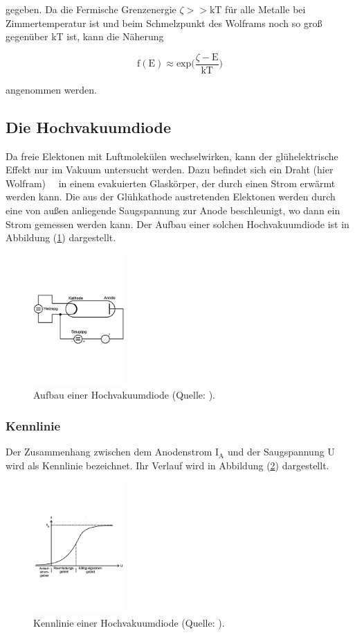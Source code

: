 \noindent
gegeben.
Da die Fermische Grenzenergie $\zeta >> \text{kT}$ für alle Metalle bei Zimmertemperatur ist 
und beim Schmelzpunkt des Wolframs noch so groß gegenüber kT ist, 
kann die Näherung

\begin{equation}
\text{f}(\text{E}) \approx \text{exp} \biggl( \frac{\zeta-\text{E}}{\text{kT}} \biggr)
\label{eqn:fermi2}
\end{equation}

\noindent
angenommen werden.
%
\subsection{Die Hochvakuumdiode}

\noindent
Da freie Elektonen mit Luftmolekülen wechselwirken, kann der glühelektrische Effekt nur im Vakuum untersucht werden.
Dazu befindet sich ein Draht (hier Wolfram)    in einem evakuierten Glaskörper, der durch einen Strom erwärmt werden kann.
Die aus der Glühkathode austretenden Elektonen werden durch eine von außen anliegende Saugspannung zur Anode beschleunigt, 
wo dann ein Strom gemessen werden kann. 
Der Aufbau einer solchen Hochvakuumdiode ist in Abbildung (\ref{fig:diode}) dargestellt.

\begin{figure}
    \centering
       \includegraphics[height=5cm]{diode.pdf}
       \caption{Aufbau einer Hochvakuumdiode (Quelle: \cite{V504}).}
       \label{fig:diode}
\end{figure}

\subsubsection{Kennlinie}

\noindent
Der Zusammenhang zwischen dem Anodenstrom $\text{I}_\text{A}$ und der Saugspannung U wird als Kennlinie bezeichnet.
Ihr Verlauf wird in Abbildung (\ref{fig:kenn}) dargestellt.

\begin{figure}
    \centering
       \includegraphics[height=5cm]{kenn.pdf}
       \caption{Kennlinie einer Hochvakuumdiode (Quelle: \cite{V504}).}
       \label{fig:kenn}
\end{figure}

